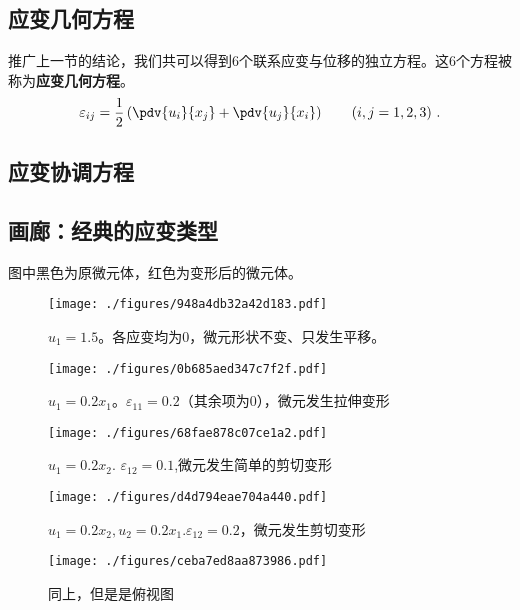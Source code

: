 \subsection{应变几何方程}
推广上一节的结论，我们共可以得到$6$个联系应变与位移的独立方程。这$6$个方程被称为\textbf{应变几何方程}。
\begin{equation}
\varepsilon_{ij} = \frac{1}{2}\left(\pdv{u_i}{x_j}+\pdv{u_j}{x_i}\right) \qquad (i,j=1,2,3)~.
\end{equation}

\subsection{应变协调方程}

\subsection{画廊：经典的应变类型}
图中黑色为原微元体，红色为变形后的微元体。
\begin{figure}[ht]
\centering
\texttt{[image: ./figures/948a4db32a42d183.pdf]}
\caption{$u_1=1.5$。各应变均为$0$，微元形状不变、只发生平移。} \label{fig_Strain_9}
\end{figure}

\begin{figure}[ht]
\centering
\texttt{[image: ./figures/0b685aed347c7f2f.pdf]}
\caption{$u_1=0.2x_1$。$\varepsilon_{11}=0.2$（其余项为$0$），微元发生拉伸变形} \label{fig_Strain_5}
\end{figure}

\begin{figure}[ht]
\centering
\texttt{[image: ./figures/68fae878c07ce1a2.pdf]}
\caption{$u_1=0.2x_2$. $\varepsilon_{12}=0.1$,微元发生简单的剪切变形} \label{fig_Strain_6}
\end{figure}

\begin{figure}[ht]
\centering
\texttt{[image: ./figures/d4d794eae704a440.pdf]}
\caption{$u_1=0.2x_2, u_2=0.2x_1$.$\varepsilon_{12}=0.2$，微元发生剪切变形} \label{fig_Strain_8}
\end{figure}
\begin{figure}[ht]
\centering
\texttt{[image: ./figures/ceba7ed8aa873986.pdf]}
\caption{同上，但是是俯视图} \label{fig_Strain_7}
\end{figure}

